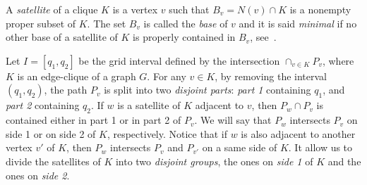 \documentclass[9pt]{entcs}
\newtheorem{lema}{Lemma}[section]
\newtheorem{defi}{Definition}[section]
\begin{document}
 




  A \textit{satellite} of a clique $K$ is a vertex $v$ such that $B_v=N(v)\cap K$ is a 
nonempty proper subset of $K$. The set $B_v$ is called the \textit{base} of $v$ and it is said \textit{minimal} if no other
base of a satellite of $K$ is properly contained in $B_v$, see~\cite{alcon2010necessary}.


 Let $I=[q_1,q_2]$ be the grid interval defined by the intersection $\displaystyle \cap_{v\in K}P_v$, where $K$
is an edge-clique of a graph $G$. For any $v\in K$, by removing the interval $(q_1,q_2)$, the path $P_v$
is split into two \textit{disjoint parts}: \textit{part 1}  containing $q_1$, and  \textit{part 2}  containing $q_2$.
If $w$  is a satellite of $K$ adjacent to $v$, then
$P_w\cap P_v$ is contained either in part 1 or in part 2 of $P_v$. We will say that $P_w$ intersects $P_v$
on side 1 or on side 2 of $K$, respectively. Notice that if $w$  is also adjacent
to another vertex $v'$ of $K$, then   $P_w$ intersects $P_v$ and $P_{v'}$ on
a same side of $K$. It allow us to divide the satellites of $K$ into two \textit{disjoint
groups}, the ones on  \textit{side 1} of $K$ and the ones on \textit{side 2}.


\end{document}
